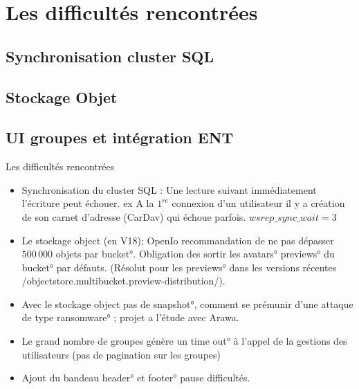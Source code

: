 
\section{Les difficultés rencontrées}
\subsection{Synchronisation cluster SQL}
\subsection{Stockage Objet}
\subsection{UI groupes et intégration ENT}
\begin{frame}[fragile]{Les difficultés rencontrées}

\begin{itemize}
	\item Synchronisation du cluster SQL : Une lecture suivant immédiatement l'écriture peut échouer.  
	ex A la $1^{re}$ connexion d'un utilisateur il y a création de son carnet d'adresse (CarDav) qui échoue parfois.
		$wsrep\_sync\_wait = 3$
\end{itemize}
\begin{itemize}

\item Le stockage object (en \small{V18});  OpenIo recommandation de ne pas dépasser $500\,000$ objets par \ang{bucket}. Obligation des sortir les \ang{avatars} \ang{previews} du \ang{bucket} par défauts. (Résolut pour les \ang{previews} dans les versions récentes \code/objectstore.multibucket.preview-distribution/).

\item Avec le stockage object pas de \ang{snapshot}, comment se prémunir d'une attaque de type \ang{ransomware} ; projet a l'étude avec Arawa. 

\end{itemize}


\begin{itemize}
 \item Le grand nombre de groupes génère un \ang{time out} à l'appel de la gestions des utilisateurs (pas de pagination sur les groupes)
 \item Ajout du bandeau \ang{header} et \ang{footer} pause difficultés. 
\end{itemize}

\end{frame}
